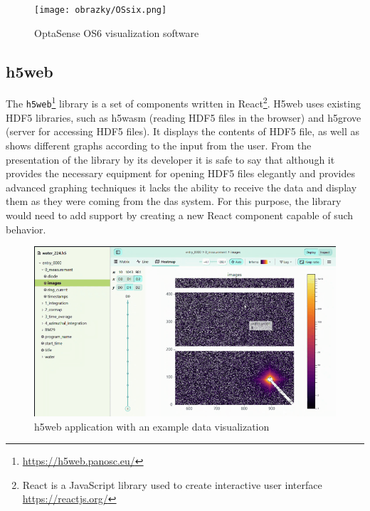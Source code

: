 \begin{figure}[t]
    \centering
    \texttt{[image: obrazky/OSsix.png]}
    \caption{OptaSense OS6 visualization software \cite{ytossix}}
    \label{fig:ossix}
\end{figure}


\subsection{h5web}\label{txt.design.h5web}

The \verb|h5web|\footnote{\url{https://h5web.panosc.eu/}} library is a set of components written in React\footnote{React is a JavaScript library used to create interactive user interface \url{https://reactjs.org/}}. H5web uses existing HDF5 libraries, such as h5wasm (reading HDF5 files in the browser) and h5grove (server for accessing HDF5 files). It displays the contents of HDF5 file, as well as shows different graphs according to the input from the user. From the presentation of the library by its developer it is safe to say that although it provides the necessary equipment for opening HDF5 files elegantly and provides advanced graphing techniques it lacks the ability to receive the data and display them as they were coming from the \ac{das} system. For this purpose, the library would need to add support by creating a new React component capable of such behavior.

\begin{figure}
    \centering
    \includegraphics[width=\linewidth]{obrazky/h5web.png}
    \caption{h5web application with an example data visualization}
    \label{fig:h5web}
\end{figure}

\newpage